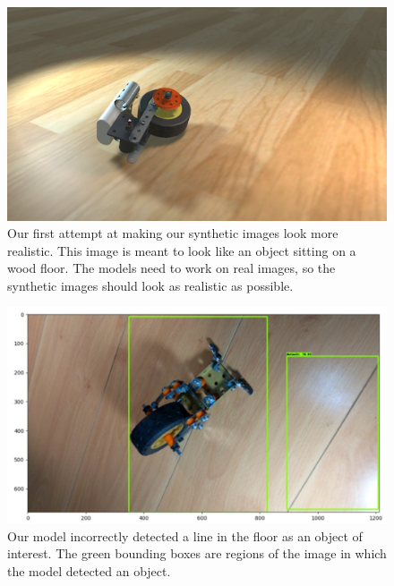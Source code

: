 \begin{figure}
  \vspace{-0.2in}
  \includegraphics[width=\columnwidth]{figures/synthetic/wood_floor.png}
  \caption[
  Our first attempt at making our synthetic images look more realistic
  ]{
    Our first attempt at making our synthetic images look more realistic.
    This image is meant to look like an object sitting on a wood floor.
    The models need to work on real images, so the synthetic images should look
    as realistic as possible.
  }\label{fig:wood_floor}
  \vspace{-0.2in}
\end{figure}

\begin{figure}
  \includegraphics[width=\columnwidth]{figures/synthetic/false_positive.png}
  \caption[
  Our model incorrectly detected a line in the floor as an object of interest
  ]{
    Our model incorrectly detected a line in the floor as an object of interest.
    The green bounding boxes are regions of the image in which the model
    detected an object.
  }\label{fig:false_positive}
\end{figure}

